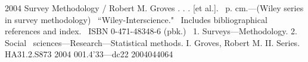 

%


\frontmatter


\subtitle{MAT2040 Notebook}



\halftitlepage
\titlepage



% 
 \begin{copyrightpage}{2004}
 Survey Methodology / Robert M. Groves . . . [et al.].
 \       p. cm.---(Wiley series in survey methodology)
 \    ``Wiley-Interscience."
 \    Includes bibliographical references and index.
 \    ISBN 0-471-48348-6 (pbk.)
 \    1. Surveys---Methodology.  2. Social 
 \  sciences---Research---Statistical methods.  I. Groves, Robert M.  II. %
 Series.\\

 HA31.2.S873 2004
 001.4'33---dc22                                             2004044064
 \end{copyrightpage}

